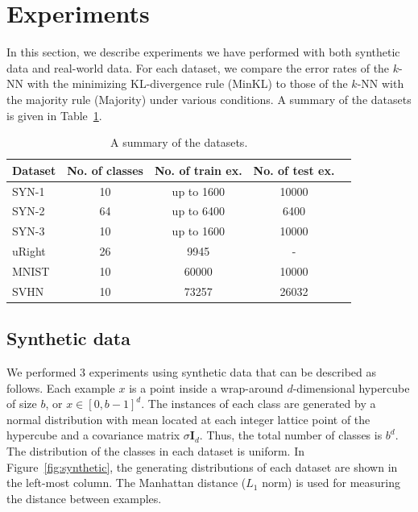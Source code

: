 \documentclass{article}
\begin{document}
\section{Experiments}
\label{sec:results}
In this section, we describe experiments we have performed with both
synthetic data and real-world data. For each dataset, we compare the
error rates of the $k$-NN with the minimizing KL-divergence rule
(MinKL) to those of the $k$-NN with the majority rule (Majority) under
various conditions. A summary of the datasets is given in
Table~\ref{table:results}.

\begin{table}[tb]
\caption{A summary of the datasets.}
\label{table:results}
\vskip 0.1in
\begin{center}
\begin{scriptsize}
\begin{sc}
\begin{tabular}{lcccc}
  \hline
  \abovespace\belowspace
  Dataset & No. of classes & No. of train ex. & No. of test ex. \\
  \hline
  \abovespace
  SYN-1 & 10 & up to 1600 & 10000\\
  SYN-2 & 64 & up to 6400 & 6400\\
  \belowspace
  SYN-3 & 10 & up to 1600 & 10000\\
  \hline
  \abovespace
  uRight & 26 & 9945 & -  \\
  MNIST & 10 & 60000 & 10000 \\
  \belowspace
  SVHN & 10 & 73257 & 26032\\
  \hline
\end{tabular}
\end{sc}
\end{scriptsize}
\end{center}
\vskip -0.1in
\end{table}

\subsection{Synthetic data}
We performed 3 experiments using synthetic data that can be described
as follows. Each example $x$ is a point inside a wrap-around
$d$-dimensional hypercube of size $b$, or $x \in [0,b-1]^d$. The
instances of each class are generated by a normal distribution with
mean located at each integer lattice point of the hypercube and a
covariance matrix $\sigma \mathbf{I}_d$. Thus, the total number of
classes is $b^d$. The distribution of the classes in each dataset is
uniform. In Figure~\ref{fig:synthetic}, the generating distributions
of each dataset are shown in the left-most column. The Manhattan
distance ($L_1$ norm) is used for measuring the distance between
examples.
\end{document}
